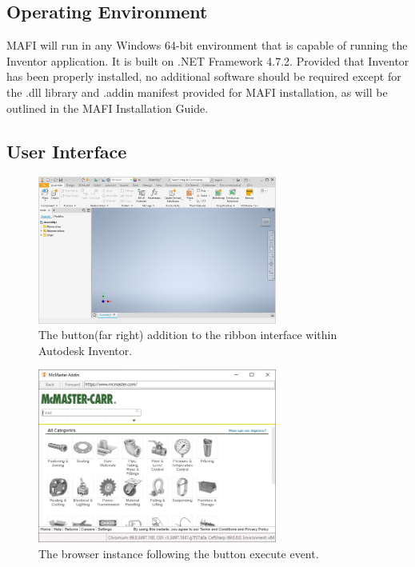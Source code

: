\documentclass[12pt, letterpaper]{article}
\begin{document}
\subsection{Operating Environment}
MAFI will run in any Windows 64-bit environment that is capable of running the Inventor application. It is built on .NET Framework 4.7.2. Provided that Inventor has been properly installed, no additional software should be required except for the .dll library and .addin manifest provided for MAFI installation, as will be outlined in the MAFI Installation Guide.
\subsection{User Interface}
\begin{figure}[H]
    \centering
    \includegraphics[width=0.7\textwidth]{Figures/mcMasterButton.JPG}
    \caption{The button(far right) addition to the ribbon interface within Autodesk Inventor.}
\end{figure}
\begin{figure}[H]
    \centering
    \includegraphics[width=0.7\textwidth]{Figures/webBrowserView.jpg}
    \caption{The browser instance following the button execute event.}
\end{figure}
\end{document}
